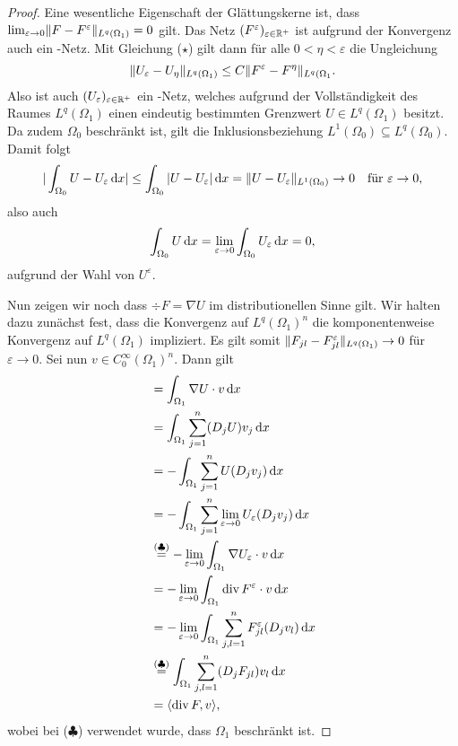 \begin{proof}
  Eine wesentliche Eigenschaft der Glättungskerne ist, dass $\lim_{\varepsilon \to 0} \lVert F - F^\varepsilon \rVert_{L^q(\Omega_1)} = 0$ gilt.
  Das Netz $(F^\varepsilon)_{\varepsilon \in \mathbb{R}^+}$ ist aufgrund der Konvergenz auch ein \cauchy-Netz.
  Mit Gleichung ($\star$) gilt dann für alle $0 < \eta < \varepsilon$ die Ungleichung
  $$
    \lVert U_\varepsilon - U_\eta \rVert_{L^q(\Omega_1)}
    \leq C \lVert F^\varepsilon - F^\eta \rVert_{L^q(\Omega_1}.
  $$
  Also ist auch $(U_\varepsilon)_{\varepsilon \in \mathbb{R}^+}$ ein \cauchy-Netz, welches aufgrund der Vollständigkeit des Raumes $L^q(\Omega_1)$ einen eindeutig bestimmten Grenzwert $U \in L^q(\Omega_1)$ besitzt.
  Da zudem $\Omega_0$ beschränkt ist, gilt die Inklusionsbeziehung $L^1(\Omega_0) \subseteq L^q(\Omega_0)$.
  Damit folgt
  $$
    | \int_{\Omega_0} U - U_\varepsilon \, {\operatorname{d}\!{x}} |
    \leq  \int_{\Omega_0} | U - U_\varepsilon | \, {\operatorname{d}\!{x}} 
    = \lVert U - U_\varepsilon \rVert_{L^1(\Omega_0)} 
    \to 0 \quad\text{für } \varepsilon \to 0,
  $$
  also auch
  $$
    \int_{\Omega_0} U \, {\operatorname{d}\!{x}} = \lim_{\varepsilon \to 0} \int_{\Omega_0} U_\varepsilon \, {\operatorname{d}\!{x}} =  0,
  $$
  aufgrund der Wahl von $U^\varepsilon$.

  Nun zeigen wir noch dass $\div F = \nabla U$ im distributionellen Sinne gilt. 
  Wir halten dazu zunächst fest, dass die Konvergenz auf $L^q(\Omega_1)^n$ die komponentenweise Konvergenz auf $L^q(\Omega_1)$ impliziert.
  Es gilt somit $\lVert F_{jl} - F_{jl}^\varepsilon \rVert_{L^q(\Omega_1)} \to 0$ für $\varepsilon \to 0$.
  Sei nun $v \in C_0^\infty(\Omega_1)^n$.
  Dann gilt
  \begin{align*}
    [\nabla U, v]
    &= \int_{\Omega_1} \nabla U \cdot v \d x \\
    &= \int_{\Omega_1} \sum_{j = 1}^n (D_j U) v_j \d x \\
    &= -\int_{\Omega_1} \sum_{j = 1}^n U (D_j v_j) \d x \\ 
    &= -\int_{\Omega_1} \sum_{j = 1}^n \lim_{\varepsilon \to 0} U_\varepsilon (D_j v_j) \d x \\
    &\overset{(\clubsuit)}{=} -\lim_{\varepsilon \to 0} \int_{\Omega_1} \nabla U_\varepsilon \cdot v \d x \\
    &= -\lim_{\varepsilon \to 0} \int_{\Omega_1} \div F^\varepsilon \cdot v \d x \\
    &= -\lim_{\varepsilon \to 0} \int_{\Omega_1} \sum_{j,l=1}^n F_{jl}^\varepsilon (D_j v_l) \d x \\
    &\overset{(\clubsuit)}{=} \int_{\Omega_1} \sum_{j,l=1}^n (D_j F_{jl}) v_l \d x \\
    &= \langle \div F, v \rangle,
  \end{align*}
  wobei bei ($\clubsuit$) verwendet wurde, dass $\Omega_1$ beschränkt ist.


\end{proof}
